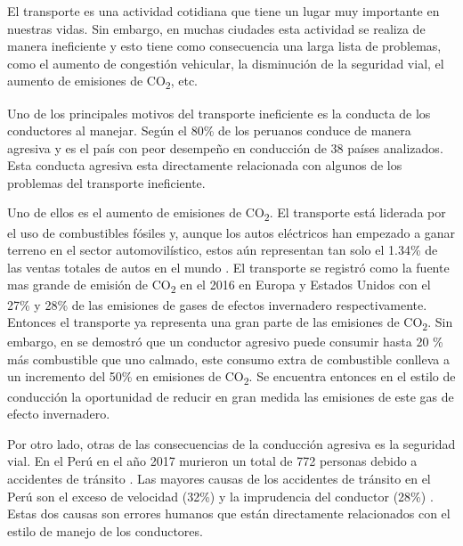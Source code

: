 \begin{introduction}

El transporte es una actividad cotidiana que tiene un lugar muy importante en nuestras vidas. Sin embargo, en muchas ciudades esta actividad se realiza de manera ineficiente y esto tiene como consecuencia una larga lista de problemas, como el aumento de congestión vehicular, la disminución de la seguridad vial, el aumento de emisiones de CO\textsubscript{2}, etc.

Uno de los principales motivos del transporte ineficiente es la conducta de los conductores al manejar. Según \cite{publimetro_2017} el 80\% de los peruanos conduce de manera agresiva y es el país con peor desempeño en conducción de 38 países analizados. Esta conducta agresiva esta directamente relacionada con algunos de los problemas del transporte ineficiente.

Uno de ellos es el aumento de emisiones de CO\textsubscript{2}. El transporte está liderada por el uso de combustibles fósiles y, aunque los autos eléctricos han empezado a ganar terreno en el sector automovilístico, estos aún representan tan solo el 1.34\% de las ventas totales de autos en el mundo \cite{website:EV-sales}. El transporte se registró como la fuente mas grande de emisión de CO\textsubscript{2} en el 2016 en Europa y Estados Unidos con el 27\% y 28\% de las emisiones de gases de efectos invernadero respectivamente. Entonces el transporte ya representa una gran parte de las emisiones de CO\textsubscript{2}. Sin embargo, en \cite{7919305} se demostró que un conductor agresivo puede consumir hasta 20 \% más combustible que uno calmado, este consumo extra de combustible conlleva a un incremento del 50\% en emisiones de CO\textsubscript{2}. Se encuentra entonces en el estilo de conducción la oportunidad de reducir en gran medida las emisiones de este gas de efecto invernadero.


Por otro lado, otras de las consecuencias de la conducción agresiva es la seguridad vial. En el Perú en el año 2017 murieron un total de 772 personas debido a accidentes de tránsito \cite{website:El-comercio}. Las mayores causas de los accidentes de tránsito en el Perú son el exceso de velocidad (32\%) y la imprudencia del conductor (28\%) \cite{website:PNP-accidentes}. Estas dos causas son errores humanos que están directamente relacionados con el estilo de manejo de los conductores.


\end{introduction}
